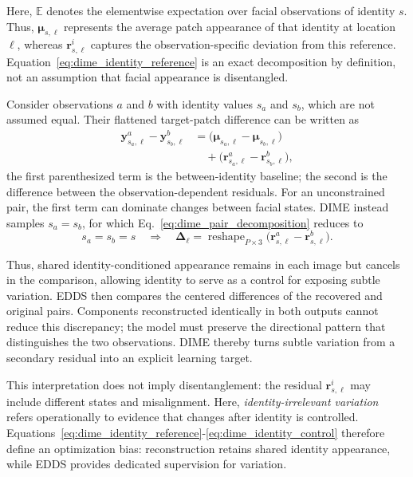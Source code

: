 \documentclass[10pt,journal,compsoc]{IEEEtran}
\begin{document}
Here, $\mathbb{E}$ denotes the elementwise expectation over facial observations of identity $s$. Thus, $\boldsymbol{\mu}_{s,\ell}$ represents the average patch appearance of that identity at location $\ell$, whereas $\mathbf{r}^{i}_{s,\ell}$ captures the observation-specific deviation from this reference. Equation~\eqref{eq:dime_identity_reference} is an exact decomposition by definition, not an assumption that facial appearance is disentangled.

Consider observations $a$ and $b$ with identity values $s_a$ and $s_b$, which are not assumed equal. Their flattened target-patch difference can be written as
\begin{equation}
\begin{aligned}
\mathbf{y}^{a}_{s_a,\ell}
-\mathbf{y}^{b}_{s_b,\ell}
&=\bigl(\boldsymbol{\mu}_{s_a,\ell}
-\boldsymbol{\mu}_{s_b,\ell}\bigr)\\
&\quad+\bigl(\mathbf{r}^{a}_{s_a,\ell}
-\mathbf{r}^{b}_{s_b,\ell}\bigr),
\end{aligned}
\label{eq:dime_pair_decomposition}
\end{equation}
the first parenthesized term is the between-identity baseline; the second is the difference between the observation-dependent residuals. For an
unconstrained pair, the first term can dominate changes between facial states. DIME instead samples $s_a=s_b$, for which Eq.~\eqref{eq:dime_pair_decomposition} reduces to
\begin{equation}
s_a=s_b=s
\quad\Longrightarrow\quad
\boldsymbol{\Delta}_{\ell}
=\operatorname{reshape}_{P\times3}
\bigl(\mathbf{r}^{a}_{s,\ell}-\mathbf{r}^{b}_{s,\ell}\bigr).
\label{eq:dime_identity_control}
\end{equation}

Thus, shared identity-conditioned appearance remains in each image but cancels in the comparison, allowing identity to serve as a control for exposing subtle variation. EDDS then compares the centered differences of the recovered and original pairs. Components reconstructed identically in both outputs cannot reduce this discrepancy; the model must preserve the directional pattern that distinguishes the two observations. DIME thereby turns subtle variation from a secondary residual into an explicit learning target.

This interpretation does not imply disentanglement: the residual $\mathbf{r}^{i}_{s,\ell}$ may include different states and misalignment. Here, \emph{identity-irrelevant variation} refers operationally to evidence that changes after identity is controlled. Equations~\eqref{eq:dime_identity_reference}-\eqref{eq:dime_identity_control} therefore define an optimization bias: reconstruction retains shared identity appearance, while EDDS provides dedicated supervision for variation.
\end{document}
